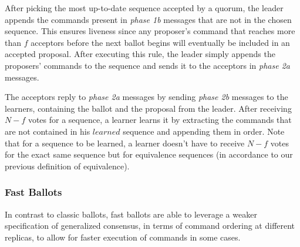 After picking the most up-to-date sequence accepted by a quorum, the leader appends the commands present in \textit{phase 1b} messages that are not in the chosen sequence. This ensures liveness since any proposer's command that reaches more than $f$ acceptors before the next ballot begins will eventually be included in an accepted proposal. After executing this rule, the leader simply appends the proposers' commands to the sequence and sends it to the acceptors in \textit{phase 2a} messages.\par

The acceptors reply to \textit{phase 2a} messages by sending \textit{phase 2b} messages to the learners, containing the ballot and the proposal from the leader. After receiving $N-f$ votes for a sequence, a learner learns it by extracting the commands that are not contained in his $learned$ sequence and appending them in order. Note that for a sequence to be learned, a learner doesn't have to receive $N-f$ votes for the exact same sequence but for equivalence sequences (in accordance to our previous definition of equivalence).

\subsubsection{Fast Ballots} 

In contrast to classic ballots, fast ballots are able to leverage a weaker specification of generalized consensus, in terms of command ordering at different replicas, to allow for faster execution of commands in some cases.

